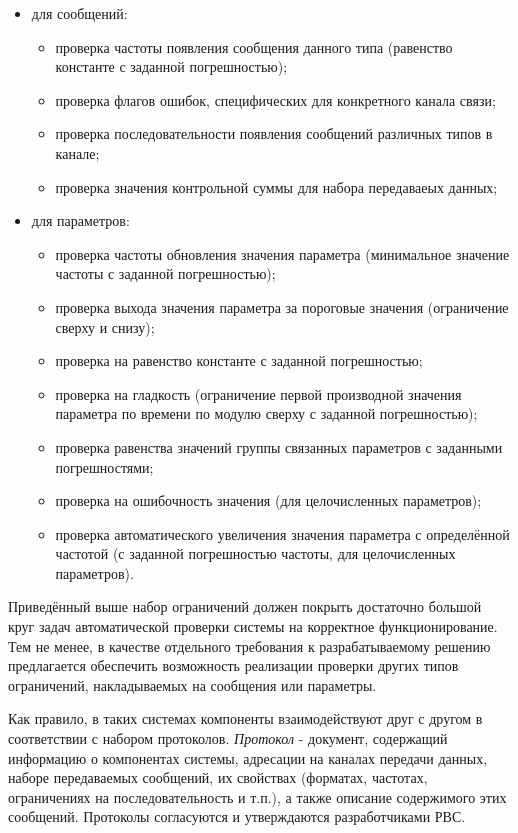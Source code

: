 \begin{itemize}
 \item для сообщений:
 \begin{itemize}
  \item проверка частоты появления сообщения данного типа (равенство константе 
с заданной погрешностью);
  \item проверка флагов ошибок, специфических для конкретного канала связи;
  \item проверка последовательности появления сообщений различных типов в 
канале;
  \item проверка значения контрольной суммы для набора передаваеых данных;
 \end{itemize}
 \item для параметров:
 \begin{itemize}
  \item проверка частоты обновления значения параметра (минимальное значение 
частоты с заданной погрешностью);
  \item проверка выхода значения параметра за пороговые значения (ограничение 
сверху и снизу);
  \item проверка на равенство константе с заданной погрешностью;
  \item проверка на гладкость (ограничение первой производной значения 
параметра по времени по модулю сверху с заданной погрешностью);
  \item проверка равенства значений группы связанных параметров с заданными 
погрешностями;
  \item проверка на ошибочность значения (для целочисленных параметров);
  \item проверка автоматического увеличения значения параметра с определённой 
частотой (с заданной погрешностью частоты, для целочисленных параметров).
 \end{itemize}
\end{itemize}

Приведённый выше набор ограничений должен покрыть достаточно большой круг задач 
автоматической проверки системы на корректное функционирование. Тем не менее, 
в качестве отдельного требования к разрабатываемому решению предлагается 
обеспечить возможность реализации проверки других типов ограничений, 
накладываемых на сообщения или параметры.


\iffalse
Как правило, в таких системах компоненты взаимодействуют друг с другом в 
соответствии с набором протоколов. \textit{Протокол} - документ, содержащий 
информацию о компонентах системы, адресации на каналах передачи данных, наборе 
передаваемых сообщений, их свойствах (форматах, частотах, ограничениях на 
последовательность и т.п.), а также описание содержимого этих сообщений. 
Протоколы согласуются и утверждаются разработчиками РВС.

